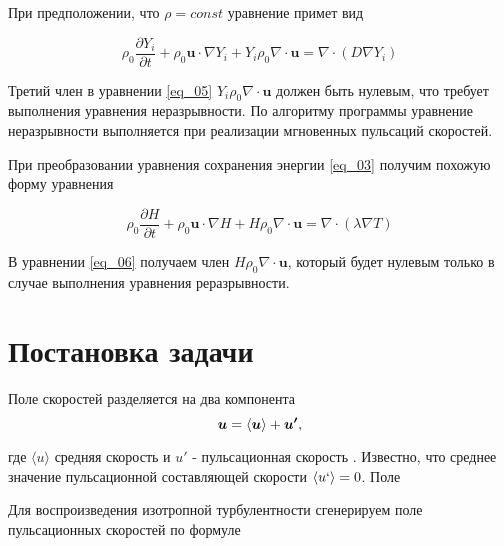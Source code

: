 \documentclass[12pt,a4paper]{article}
\begin{document}
При предположении, что $\rho = const$ уравнение примет вид

\begin{equation}\label{eq_05}
\rho_0 \frac{\partial Y_i}{\partial t} + 
\rho_0 \boldsymbol{u}\cdot \nabla Y_i  + 
Y_i \rho_0 \nabla\cdot \boldsymbol{u} = 
 	\nabla \cdot \left( D \nabla Y_i \right)
\end{equation}


Третий член в уравнении \eqref{eq_05} $Y_i \rho_0 \nabla\cdot  \boldsymbol{u}$ должен быть нулевым, что требует выполнения уравнения неразрывности. По алгоритму программы  уравнение неразрывности выполняется при реализации мгновенных пульсаций скоростей.

При преобразовании уравнения сохранения энергии \eqref{eq_03} получим  похожую форму уравнения

\begin{equation}\label{eq_06}
\rho_0 \frac{\partial H}{\partial t} + 
\rho_0 \boldsymbol{u}\cdot \nabla H  + 
H  \rho_0 \nabla\cdot \boldsymbol{u} = 
\nabla \cdot \left( \lambda \nabla T \right)
\end{equation}

В уравнении \eqref{eq_06} получаем член $H  \rho_0 \nabla\cdot \boldsymbol{u}$, который будет нулевым только в случае выполнения уравнения реразрывности. 

%
%
\section{Постановка задачи}
Поле скоростей разделяется на два компонента
\begin{equation} \label{eq_u_main}
\boldsymbol{u} = \langle \boldsymbol{u} \rangle + \boldsymbol{u'} \\ ,
\end{equation}

где $ \langle u \rangle $ средняя скорость  и $u'$ - пульсационная скорость . Известно, что среднее значение пульсационной составляющей скорости $\langle u`\rangle = 0 $.
Поле


Для воспроизведения изотропной турбулентности сгенерируем поле пульсационных скоростей по формуле
\end{document}
